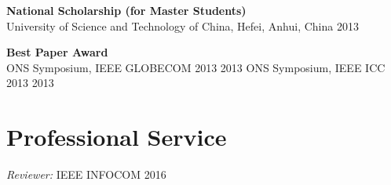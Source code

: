 \documentclass[line,11pt,letter]{C:\Users\lgong\Dropbox\git-reps\easy_cv\includes/cls\myRes}
\begin{document}
\begin{resume}
{\setlength{\parskip}{0pt}
{\bf National Scholarship (for Master Students)}\\
{\hspace*{1em} University of Science and Technology of China, Hefei, Anhui, China \hfill 2013\break}
}
\sspace

{\setlength{\parskip}{0pt}
{\bf Best Paper Award}\\
{\hspace*{1em} ONS Symposium, IEEE GLOBECOM 2013 \hfill 2013\break}
{\hspace*{1em} ONS Symposium, IEEE ICC 2013 \hfill 2013\break}
}
\vspace*{2pt}
\negspace
\section{Professional Service}
\vspace{-4pt}
\setlength{\parskip}{0pt}
{\sl Reviewer:} \textsc{IEEE INFOCOM 2016}\\
% 
\end{resume}
\end{document}
